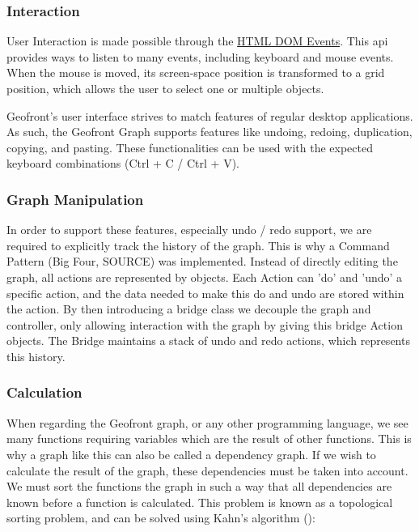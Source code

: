 \subsubsection{Interaction}
User Interaction is made possible through the \href{https://developer.mozilla.org/en-US/docs/web/api/event}{HTML DOM Events}. 
This api provides ways to listen to many events, including keyboard and mouse events. 
When the mouse is moved, its screen-space position is transformed to a grid position, which allows the user to select one or multiple objects. 

Geofront's user interface strives to match features of regular desktop applications. 
As such, the Geofront Graph supports features like undoing, redoing, duplication, copying, and pasting. 
These functionalities can be used with the expected keyboard combinations (Ctrl + C / Ctrl + V).

\subsubsection*{Graph Manipulation}

In order to support these features, especially undo / redo support, we are required to explicitly track the history of the graph. 
This is why a Command Pattern (Big Four, SOURCE) was implemented.
Instead of directly editing the graph, all actions are represented by  objects. 
Each Action can 'do' and 'undo' a specific action, and the data needed to make this do and undo are stored within the action. 
By then introducing a bridge class we decouple the graph and controller, only allowing interaction with the graph by giving this bridge Action objects. The Bridge maintains a stack of undo and redo actions, which represents this history.  


\subsubsection*{Calculation}

When regarding the Geofront graph, or any other programming language, we see many functions requiring variables which are the result of other functions. 
This is why a graph like this can also be called a dependency graph. 
If we wish to calculate the result of the graph, these dependencies must be taken into account. 
We must sort the functions the graph in such a way that all dependencies are known before a function is calculated.
This problem is known as a topological sorting problem, and can be solved using Kahn's algorithm (): 

